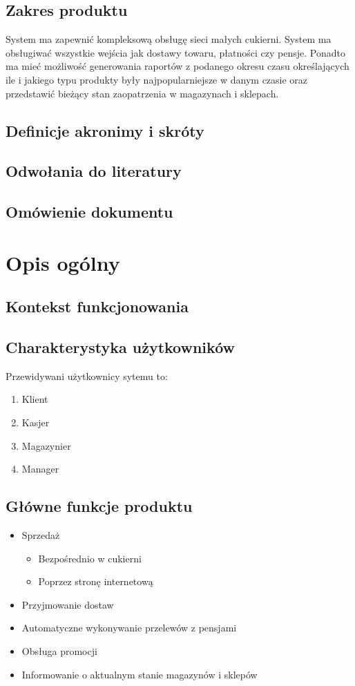 \documentclass[16pt,a4paper]{article}
\begin{document}
\subsection{Zakres produktu}
System ma zapewnić kompleksową obsługę sieci małych cukierni. System ma obsługiwać wszystkie wejścia jak dostawy towaru, płatności czy pensje. Ponadto ma mieć możliwość generowania raportów z podanego okresu czasu określających ile i jakiego typu produkty były najpopularniejsze w danym czasie oraz przedstawić bieżący stan zaopatrzenia w magazynach i sklepach. 
\subsection{Definicje akronimy i skróty}
\subsection{Odwołania do literatury}
\subsection{Omówienie dokumentu}
\section{Opis ogólny}
\subsection{Kontekst funkcjonowania}
\subsection{Charakterystyka użytkowników}
Przewidywani użytkownicy sytemu to:
\begin{enumerate}
\item Klient
\item Kasjer
\item Magazynier
\item Manager 
\end{enumerate}
\subsection{Główne funkcje produktu}
\begin{itemize}
    \item Sprzedaż
    \begin{itemize}
        \item  Bezpośrednio w cukierni
        \item  Poprzez stronę internetową
    \end{itemize}

    \item Przyjmowanie dostaw
    \item Automatyczne wykonywanie przelewów z pensjami
    \item Obsługa promocji
    \item Informowanie o aktualnym stanie magazynów i sklepów
\end{itemize}
\end{document}
